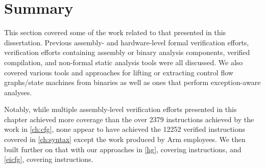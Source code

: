 \section{Summary}
This section covered some of the work related to that presented in this dissertation.
Previous assembly- and hardware-level formal verification efforts,
verification efforts containing assembly or binary analysis components,
verified compilation, and non-formal static analysis tools were all discussed.
We also covered various tools and approaches for lifting or extracting control flow graphs/state machines from binaries as well as ones that perform exception-aware analyses.

Notably, while multiple assembly-level verification efforts
presented in this chapter achieved more coverage
than the over \num{2379} instructions achieved by the work in \cref{ch:cfg},
none appear to have achieved the \num{12252}
verified instructions covered in \cref{ch:syntax} except the work produced by
Arm employees.
We then built further on that with our approaches in \cref{hg}, covering  instructions, and \cref{eicfg}, covering  instructions.
